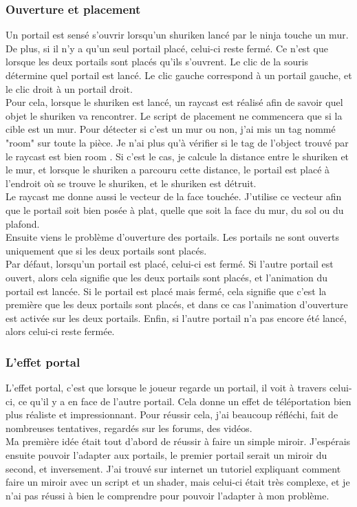 \documentclass[12pt]{article}
\begin{document}
\subsubsection{Ouverture et placement}

Un portail est sensé s'ouvrir lorsqu'un shuriken lancé par le ninja touche un mur. De plus, si il n'y a qu'un seul portail placé, celui-ci reste fermé. Ce n'est que lorsque les deux portails sont placés qu'ils s'ouvrent. Le clic de la souris détermine quel portail est lancé. Le clic gauche correspond à un portail gauche, et le clic droit à un portail droit.\\

Pour cela, lorsque le shuriken est lancé, un \gls{raycast} est réalisé afin de savoir quel objet le shuriken va rencontrer. Le script de placement ne commencera que si la cible est un mur. Pour détecter si c'est un mur ou non, j'ai mis un \gls{tag} nommé "room" sur toute la pièce. Je n'ai plus qu'à vérifier si le tag de l'object trouvé par le raycast est bien \og room \fg{}. Si c'est le cas, je calcule la distance entre le shuriken et le mur, et lorsque le shuriken a parcouru cette distance, le portail est placé à l'endroit où se trouve le shuriken, et le shuriken est détruit.\\
Le raycast me donne aussi le vecteur de la face touchée. J'utilise ce vecteur afin que le portail soit bien posée à plat, quelle que soit la face du mur, du sol ou du plafond.\\

Ensuite viens le problème d'ouverture des portails. Les portails ne sont ouverts uniquement que si les deux portails sont placés.\\
Par défaut, lorsqu'un portail est placé, celui-ci est fermé. Si l'autre portail est ouvert, alors cela signifie que les deux portails sont placés, et l'animation du portail est lancée. Si le portail est placé mais fermé, cela signifie que c'est la première que les deux portails sont placés, et dans ce cas l'animation d'ouverture est activée sur les deux portails. Enfin, si l'autre portail n'a pas encore été lancé, alors celui-ci reste fermée.

\subsubsection{L'effet portal}

L'effet portal, c'est que lorsque le joueur regarde un portail, il voit à travers celui-ci, ce qu'il y a en face de l'autre portail. Cela donne un effet de téléportation bien plus réaliste et impressionnant. Pour réussir cela, j'ai beaucoup réfléchi, fait de nombreuses tentatives, regardés sur les forums, des vidéos.\\
Ma première idée était tout d'abord de réussir à faire un simple miroir. J'espérais ensuite pouvoir l'adapter aux portails, le premier portail serait un miroir du second, et inversement. J'ai trouvé sur internet \cite{mirror} 	un tutoriel expliquant comment faire un miroir avec un script et un \gls{shader}, mais celui-ci était très complexe, et je n'ai pas réussi à bien le comprendre pour pouvoir l'adapter à mon problème.\\
\end{document}
